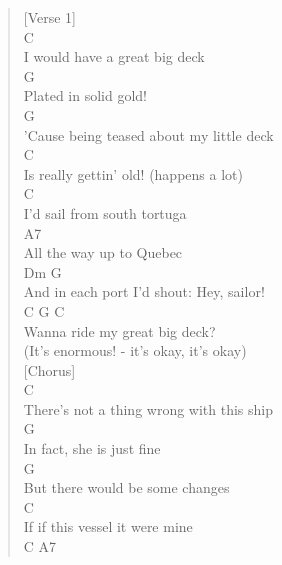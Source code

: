 \documentclass[11pt]{article}
\begin{document}
\begin{verse}
\vspace*{1em}
[Verse 1]\\
\vspace*{1em}
\hspace*{1em}C\\
I would have a great big deck\\
\hspace*{1em}G\\
Plated in solid gold!\\
\hspace*{1em}G\\
'Cause being teased about my little deck\\
\hspace*{1em}C\\
Is really gettin' old! (happens a lot)\\
\hspace*{5em}C\\
I'd sail from south tortuga\\
\hspace*{9em}A7\\
All the way up to Quebec\\
\hspace*{7em}Dm             G\\
And in each port I'd shout: Hey, sailor!\\
\hspace*{7em}C        G        C\\
Wanna ride my great big deck?\\
\vspace*{1em}
(It's enormous! - it's okay, it's okay)\\
\vspace*{1em}
\vspace*{1em}
[Chorus]\\
\vspace*{1em}
\hspace*{1em}C\\
There's not a thing wrong with this ship\\
\hspace*{1em}G\\
In fact, she is just fine\\
\hspace*{1em}G\\
But there would be some changes\\
\hspace*{1em}C\\
If if this vessel it were mine\\
\hspace*{1em}C                           A7\\

\end{verse}
\end{document}
